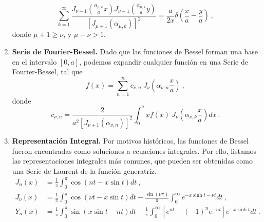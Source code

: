 \begin{propiedad}
\begin{enumerate}
        \begin{equation}
            \sum_{k=1}^\infty \frac{J_{\nu-1} \left(\frac{ \alpha_{\mu, k}}{a}x \right) J_{\nu-1} \left(\frac{\alpha_{\mu, k}}{a} y \right)}{\left[J_{\mu+1}(\alpha_{\mu, k})\right]^2} = \frac{a}{2x} \delta\left( \frac{x}{a} - \frac{y}{a} \right) \ ,
        \end{equation}
        donde $\mu + 1 \geq \nu$, y $\mu - \nu > 1$.
        \item \textbf{Serie de Fourier-Bessel.} Dado que las funciones de Bessel forman una base en el intervalo $[0,a]$, podemos expandir cualquier función en una Serie de Fourier-Bessel, tal que
        \begin{equation}
            f(x) = \sum_{n=1}^\infty c_{\nu, n} \ J_\nu\left(\alpha_{\nu, n} \frac{x}{a}\right) \ ,
        \end{equation}
        donde
        \begin{equation}
            c_{\nu, n} = \frac{2}{a^2 \left[J_{\nu+1}(\alpha_{\nu, n})\right]^2} \int_0^a x f(x) \ J_\nu\left( \alpha_{\nu, k} \frac{x}{a} \right) dx \ .
        \end{equation}
        \item \textbf{Representación Integral.} Por motivos históricos, las funciones de Bessel fueron encontradas como soluciones a ecuaciones integrales. Por ello, listamos las representaciones integrales más comunes, que pueden ser obtenidas como una Serie de Laurent de la función generatriz.
        \begin{align}
            J_n(x) & = \frac{1}{\pi}\int_0^\pi \cos(nt - x\sin t) dt \ , \\
            J_\nu(x) & = \frac{1}{\pi} \int_0^\pi \cos(\nu t - x\sin t) dt - \frac{\sin(\nu \pi)}{\pi} \int_0^\infty e^{-x \sinh t - \nu t} dt \ , \\
            Y_n(x) & = \frac{1}{\pi} \int_0^\pi \sin(x\sin t - nt) dt - \frac{1}{\pi} \int_0^\infty \left[e^{nt} + (-1)^n e^{-nt} \right] e^{-x \sinh t} dt \ .
        \end{align}
    

\end{enumerate}
\end{propiedad}
